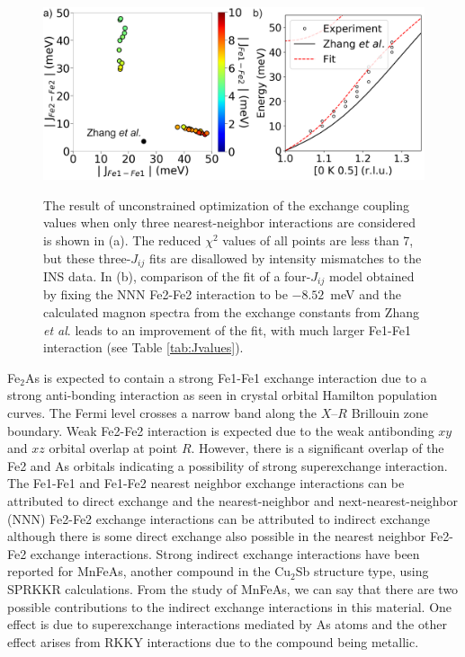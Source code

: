 \documentclass[10pt,doublespacing,edeposit]{uiucthesis2020}
\begin{document}
\begin{mainmatter}
\begin{figure}
\centering\includegraphics[width=0.8\columnwidth]{figures/ch8/magnon_spectra_refinement.png} \\
\caption{\label{fig:zhang_spinw_refinement}
The result of unconstrained optimization of the exchange coupling values when only three nearest-neighbor interactions are considered is shown in (a). The reduced $\chi^2$ values of all points are less than 7, but these three-$J_{ij}$ fits are disallowed by intensity mismatches to the INS data. In (b), comparison of the fit of a four-$J_{ij}$ model obtained by fixing the NNN Fe2-Fe2 interaction to be $-8.52$~meV and the calculated magnon spectra from the exchange constants from Zhang \emph{et al}.\cite{Zhang2013} leads to an improvement of the fit, with much larger Fe1-Fe1 interaction (see Table \ref{tab:Jvalues}). 
}
\end{figure}

Fe$_2$As is expected to contain a strong Fe1-Fe1 exchange interaction due to a strong anti-bonding interaction as seen in crystal orbital Hamilton population curves.\cite{Zhang2013}
The Fermi level crosses a narrow band along the $X$--$R$ Brillouin zone boundary. Weak Fe2-Fe2 interaction is expected due to the weak antibonding $xy$ and $xz$ orbital overlap at point $R$. However, there is a significant overlap of the Fe2 and As orbitals indicating a possibility of strong superexchange interaction.\cite{Zhang2013} The Fe1-Fe1 and Fe1-Fe2 nearest neighbor exchange interactions can be attributed to direct exchange and the nearest-neighbor and next-nearest-neighbor (NNN) Fe2-Fe2 exchange interactions can be attributed to indirect exchange although there is some direct exchange also possible in the nearest neighbor Fe2-Fe2 exchange interactions.\cite{Zhang2013}  Strong indirect exchange interactions have been reported for MnFeAs, another compound in the Cu$_2$Sb structure type, using SPRKKR calculations.\cite{Zhang2015} From the study of MnFeAs, we can say that there are two possible contributions to the indirect exchange interactions in this material. One effect is due to superexchange interactions mediated by As atoms and the other effect arises from RKKY interactions due to the compound being metallic.\cite{Zhang2015}



\end{mainmatter}
\end{document}
